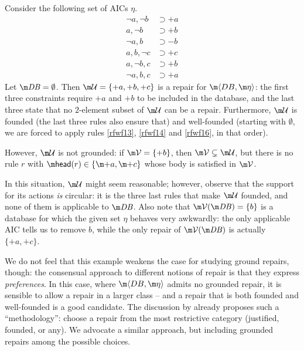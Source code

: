 \begin{example}\label{ex:founded:well-founded}
  Consider the following set of AICs $\eta$.
  \begin{align}
    \neg a,\neg b&\supset{+a} \label{rfwf13} \\
    a,\neg b&\supset{+b} \label{rfwf14} \\
    \neg a,b&\supset{-b} \label{rfwf15} \\
    a,b,\neg c&\supset{+c} \label{rfwf16} \\
    a,\neg b,c&\supset{+b} \label{rfwf17} \\
    \neg a,b,c&\supset{+a}\label{rfwf18}
  \end{align}
  Let $\db=\emptyset$.
  Then $\UU=\{{+a},{+b},{+c}\}$ is a repair for $\fulldb$: the first three constraints require ${+a}$ and ${+b}$ to be included in the database, and the last three state that no $2$-element subset of $\UU$ can be a repair.
  Furthermore, $\UU$ is founded (the last three rules also ensure that) and well-founded (starting with $\emptyset$, we are forced to apply rules \ref{rfwf13}, \ref{rfwf14} and \ref{rfwf16}, in that order).

  However, $\UU$ is not grounded: if $\VV=\{{+b}\}$, then $\VV\subsetneq\UU$, but there is no rule $r$ with $\head(r)\in\{\add a, \add c\} $ whose body is satisfied in $\VV$. %
\end{example}
In this situation, $\UU$ might seem reasonable; however, observe that the support for its actions \emph{is} circular: it is the three last rules that make $\UU$ founded, and none of them is applicable to $\db$.
Also note that $\VV(\db)=\{b\}$ is a database for which the given set $\eta$ behaves very awkwardly: the only applicable AIC tells us to remove $b$, while the only repair of $\VV(\db)$ is actually $\{{+a},{+c}\}$.

We do not feel that this example weakens the case for studying ground repairs, though: the consensual approach to different notions of repair is that they express \emph{preferences}.
In this case, where $\fulldb$ admits no grounded repair, it is sensible to allow a repair in a larger class -- and a repair that is both founded and well-founded is a good candidate.
The discussion by \citet[Section 8]{tplp/CaropreseT11} already proposes such a ``methodology'': choose a repair from the most restrictive category (justified, founded, or any).
We advocate a similar approach, but including grounded repairs among the possible choices.


